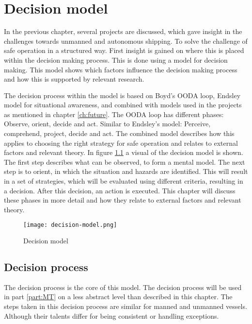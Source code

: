 \chapter{Decision model}
\label{ch:model}
In the previous chapter, several projects are discussed, which gave insight in the challenges towards unmanned and autonomous shipping. To solve the challenge of safe operation in a structured way. First insight is gained on where this is placed within the decision making process. This is done using a model for decision making. This model shows which factors influence the decision making process and how this is supported by relevant research.

The decision process within the model is based on Boyd's OODA loop, Endsley model for situational awareness, and combined with models used in the projects as mentioned in chapter \ref{ch:future}. 
The OODA loop has different phases: Observe, orient, decide and act. Similar to Endsley's model: Perceive, comprehend, project, decide and act. 
The combined model describes how this applies to choosing the right strategy for safe operation and relates to external factors and relevant theory. In figure \ref{fig:decision-model} a visual of the decision model is shown. The first step describes what can be observed, to form a mental model. The next step is to orient, in which the situation and hazards are identified. This will result in a set of strategies, which will be evaluated using different criteria, resulting in a decision. After this decision, an action is executed. This chapter will discuss these phases in more detail and how they relate to external factors and relevant theory.

\begin{figure}[hb]
	\centering
	\texttt{[image: decision-model.png]}
	\caption{Decision model}
	\label{fig:decision-model}
\end{figure}

\section{Decision process}
The decision process is the core of this model. The decision process will be used in part \ref{part:MT} on a less abstract level than described in this chapter. The steps taken in this decision process are similar for manned and unmanned vessels. Although their talents differ for being consistent or handling exceptions.

